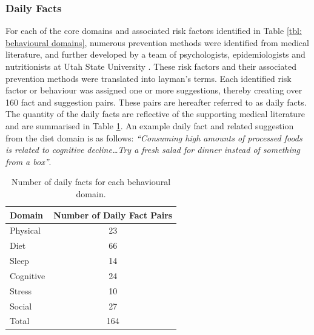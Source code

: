 \subsubsection{Daily Facts}
For each of the core domains and associated risk factors identified in Table \ref{tbl: behavioural domains},  numerous prevention methods were identified from medical literature, and further developed by a team of psychologists, epidemiologists and nutritionists at Utah State University \cite{Norton2015-TRCI}. These risk factors and their associated prevention methods were translated into layman's terms. Each identified risk factor or behaviour was assigned one or more suggestions, thereby creating over 160 fact and suggestion pairs. These pairs are hereafter referred to as daily facts. The quantity of the daily facts are reflective of the supporting medical literature and are summarised in Table \ref{tbl: daily fact count}. An example daily fact and related suggestion from the diet domain is as follows: \textit{“Consuming high amounts of processed foods is related to cognitive decline\ldots Try a fresh salad for dinner instead of something from a box”}.
\begin{table}
\centering
\caption{Number of daily facts for each behavioural domain.}
\label{tbl: daily fact count}
\begin{tabular}{@{}l c@{}}
\toprule
Domain    & Number of Daily Fact Pairs \\ 	\midrule
Physical  & 23                              \\
Diet      & 66                              \\
Sleep     & 14                              \\
Cognitive & 24                              \\
Stress    & 10                             	\\
Social    & 27                              \\ \hline \hline
Total	  & 164								\\	\bottomrule
\end{tabular}
\end{table}

